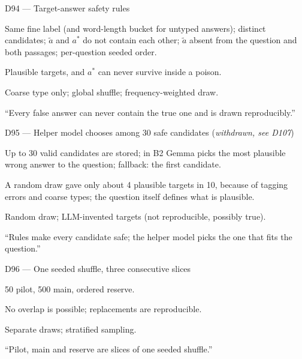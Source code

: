 \documentclass[11pt,a4paper]{report}
\begin{document}
\begin{decisionbox}{D94 --- Target-answer safety rules}
\begin{description}[nosep, leftmargin=0pt]
  \item[Decision.] Same fine label (and word-length bucket for untyped answers); distinct candidates; $\tilde{a}$ and $a^{*}$ do not contain each other; $\tilde{a}$ absent from the question and both passages; per-question seeded order.
  \item[Why.] Plausible targets, and $a^{*}$ can never survive inside a poison.
  \item[Alternatives.] Coarse type only; global shuffle; frequency-weighted draw.
  \item[Interview line.] ``Every false answer can never contain the true one and is drawn reproducibly.''
\end{description}
\end{decisionbox}

\begin{decisionbox}{D95 --- Helper model chooses among 30 safe candidates (\emph{withdrawn, see D107})}
\begin{description}[nosep, leftmargin=0pt]
  \item[Decision.] Up to 30 valid candidates are stored; in B2 Gemma picks the most plausible wrong answer to the question; fallback: the first candidate.
  \item[Why.] A random draw gave only about 4 plausible targets in 10, because of tagging errors and coarse types; the question itself defines what is plausible.
  \item[Alternatives.] Random draw; LLM-invented targets (not reproducible, possibly true).
  \item[Interview line.] ``Rules make every candidate safe; the helper model picks the one that fits the question.''
\end{description}
\end{decisionbox}

\begin{decisionbox}{D96 --- One seeded shuffle, three consecutive slices}
\begin{description}[nosep, leftmargin=0pt]
  \item[Decision.] 50 pilot, 500 main, ordered reserve.
  \item[Why.] No overlap is possible; replacements are reproducible.
  \item[Alternatives.] Separate draws; stratified sampling.
  \item[Interview line.] ``Pilot, main and reserve are slices of one seeded shuffle.''
\end{description}
\end{decisionbox}
\end{document}
